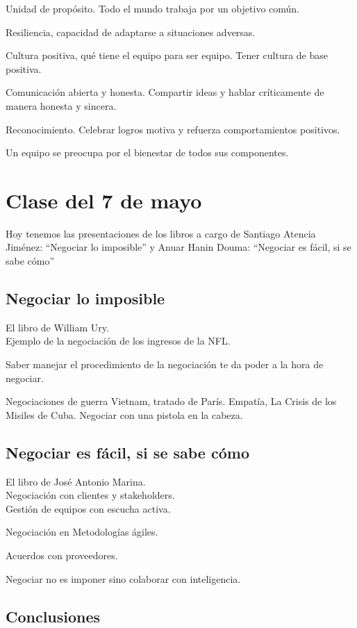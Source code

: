 \documentclass[12pt, a4paper, twoside]{article}
\begin{document}
Unidad de propósito. Todo el mundo trabaja por un objetivo común.

Resiliencia, capacidad de adaptarse a situaciones adversas.

Cultura positiva, qué tiene el equipo para ser equipo. Tener cultura de base positiva.

Comunicación abierta y honesta. Compartir ideas y hablar críticamente de manera honesta y sincera.

Reconocimiento. Celebrar logros motiva y refuerza comportamientos positivos.

Un equipo se preocupa por el bienestar de todos sus componentes.


\section{Clase del 7 de mayo}
Hoy tenemos las presentaciones de los libros a cargo de Santiago Atencia Jiménez: ``Negociar lo imposible''
y  Anuar Hanin Douma: ``Negociar es fácil, si se sabe cómo''

\subsection{Negociar lo imposible}
El libro de William Ury.\\

Ejemplo de la negociación de los ingresos de la NFL.

Saber manejar el procedimiento de la negociación te da poder a la hora de negociar.

Negociaciones de guerra Vietnam, tratado de París.
Empatía, La Crisis de los Misiles de Cuba.
Negociar con una pistola en la cabeza. 


\subsection{Negociar es fácil, si se sabe cómo}
El libro de José Antonio Marina.\\

Negociación con clientes y stakeholders.\\

Gestión de equipos con escucha activa.

Negociación en Metodologías ágiles.

Acuerdos con proveedores.

Negociar no es imponer sino colaborar con inteligencia.

\subsection{Conclusiones}
\end{document}
